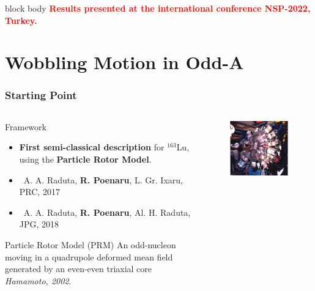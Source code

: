 \documentclass{beamer}
\begin{document}
\begin{frame}
\begin{figure}
	\end{figure}
	\vspace{-0.2cm}
	\begin{beamercolorbox}[rounded=true,shadow=false, wd=\linewidth,]{block body}
		\centering
		\textcolor{red}{\small{\textbf{Results presented at the international conference NSP-2022, Turkey.}}}
	\end{beamercolorbox}
\end{frame}

\section{Wobbling Motion in Odd-A}

\begin{frame}
	\frametitle{Starting Point}
	\begin{columns}
		\begin{column}{0.6\textwidth}
			\begin{exampleblock}{Framework}
				\begin{itemize}
					\item \textbf{First semi-classical description} for $^{163}$Lu, using the \textbf{Particle Rotor Model}.
					\item {\footnotesize \faFile\ A. A. Raduta, \textbf{R. Poenaru}, L. Gr. Ixaru, PRC, 2017}
					\item {\footnotesize \faFile\ A. A. Raduta, \textbf{R. Poenaru}, Al. H. Raduta, JPG, 2018}
				\end{itemize}
			\end{exampleblock}
			\begin{alertblock}{Particle Rotor Model (PRM)}
				An odd-nucleon moving in a quadrupole deformed mean field generated by an even-even triaxial core \textit{Hamamoto, 2002}.
			\end{alertblock}
		\end{column}
		\begin{column}{0.4\textwidth}
			\begin{figure}
				\centering
				\includegraphics[width=0.99\textwidth]{figures/euroball-4.jpg}

\end{figure}
\end{column}
\end{columns}
\end{frame}
\end{document}
